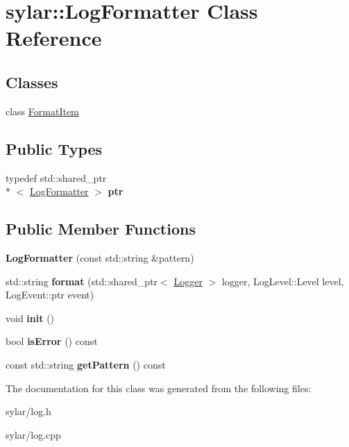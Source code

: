 \hypertarget{classsylar_1_1LogFormatter}{\section{sylar\-:\-:Log\-Formatter Class Reference}
\label{classsylar_1_1LogFormatter}
}
\subsection*{Classes}
\begin{DoxyCompactItemize}
\item 
class \hyperlink{classsylar_1_1LogFormatter_1_1FormatItem}{Format\-Item}
\end{DoxyCompactItemize}
\subsection*{Public Types}
\begin{DoxyCompactItemize}
\item 
\hypertarget{classsylar_1_1LogFormatter_a6968c960b5bed4e57badb54afd45c5e5}{typedef std\-::shared\-\_\-ptr\\*
$<$ \hyperlink{classsylar_1_1LogFormatter}{Log\-Formatter} $>$ {\bfseries ptr}}\label{classsylar_1_1LogFormatter_a6968c960b5bed4e57badb54afd45c5e5}

\end{DoxyCompactItemize}
\subsection*{Public Member Functions}
\begin{DoxyCompactItemize}
\item 
\hypertarget{classsylar_1_1LogFormatter_a939b4a2513ad3f27736346f06775369d}{{\bfseries Log\-Formatter} (const std\-::string \&pattern)}\label{classsylar_1_1LogFormatter_a939b4a2513ad3f27736346f06775369d}

\item 
\hypertarget{classsylar_1_1LogFormatter_a83b31fbad9724e424a9e2d327698311d}{std\-::string {\bfseries format} (std\-::shared\-\_\-ptr$<$ \hyperlink{classsylar_1_1Logger}{Logger} $>$ logger, Log\-Level\-::\-Level level, Log\-Event\-::ptr event)}\label{classsylar_1_1LogFormatter_a83b31fbad9724e424a9e2d327698311d}

\item 
\hypertarget{classsylar_1_1LogFormatter_a84b8213e503570f4de1655028f7debf3}{void {\bfseries init} ()}\label{classsylar_1_1LogFormatter_a84b8213e503570f4de1655028f7debf3}

\item 
\hypertarget{classsylar_1_1LogFormatter_a1a80a44095777e205f0f9828fc990de8}{bool {\bfseries is\-Error} () const }\label{classsylar_1_1LogFormatter_a1a80a44095777e205f0f9828fc990de8}

\item 
\hypertarget{classsylar_1_1LogFormatter_a8174ad4ba27aa75fa1d2978087075f96}{const std\-::string {\bfseries get\-Pattern} () const }\label{classsylar_1_1LogFormatter_a8174ad4ba27aa75fa1d2978087075f96}

\end{DoxyCompactItemize}


The documentation for this class was generated from the following files\-:\begin{DoxyCompactItemize}
\item 
sylar/log.\-h\item 
sylar/log.\-cpp\end{DoxyCompactItemize}
